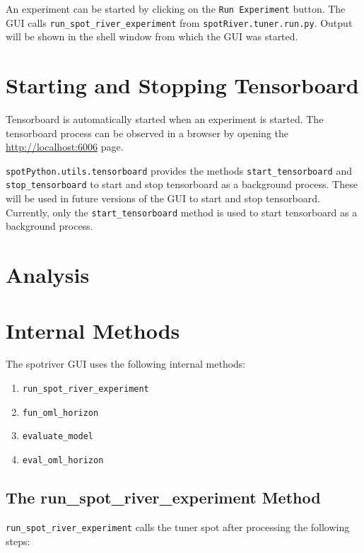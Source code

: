 \documentclass[
  letterpaper,
  DIV=11,
  numbers=noendperiod]{scrreprt}
\providecommand{\tightlist}{%
  \setlength{\itemsep}{0pt}\setlength{\parskip}{0pt}}\usepackage{longtable,booktabs,array}
\begin{document}
An experiment can be started by clicking on the \texttt{Run\ Experiment}
button. The GUI calls \texttt{run\_spot\_river\_experiment} from
\texttt{spotRiver.tuner.run.py}. Output will be shown in the shell
window from which the GUI was started.

\section{Starting and Stopping
Tensorboard}\label{starting-and-stopping-tensorboard}

Tensorboard is automatically started when an experiment is started. The
tensorboard process can be observed in a browser by opening the
\url{http://localhost:6006} page.

\texttt{spotPython.utils.tensorboard} provides the methods
\texttt{start\_tensorboard} and \texttt{stop\_tensorboard} to start and
stop tensorboard as a background process. These will be used in future
versions of the GUI to start and stop tensorboard. Currently, only the
\texttt{start\_tensorboard} method is used to start tensorboard as a
background process.

\section{Analysis}\label{analysis}

\section{Internal Methods}\label{internal-methods}

The spotriver GUI uses the following internal methods:

\begin{enumerate}
\def\labelenumi{\arabic{enumi}.}
\tightlist
\item
  \texttt{run\_spot\_river\_experiment}
\item
  \texttt{fun\_oml\_horizon}
\item
  \texttt{evaluate\_model}
\item
  \texttt{eval\_oml\_horizon}
\end{enumerate}

\subsection{The run\_spot\_river\_experiment
Method}\label{the-run_spot_river_experiment-method}

\texttt{run\_spot\_river\_experiment} calls the tuner spot after
processing the following steps:
\end{document}
